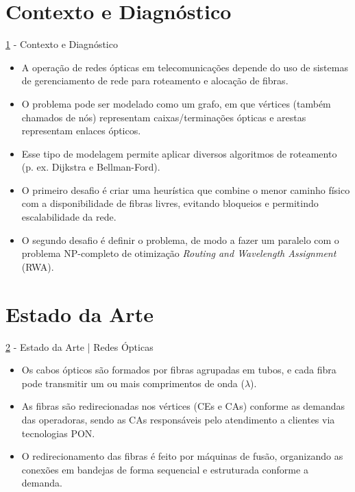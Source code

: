 \documentclass[aspectratio=169,xcolor=dvipsnames]{beamer}
\begin{document}
\section{Contexto e Diagnóstico}\label{sec:contexto}
\begin{frame}{\ref{sec:contexto} - Contexto e Diagnóstico}
\begin{itemize}
  \item A operação de redes ópticas em telecomunicações depende do uso de sistemas de gerenciamento de rede para roteamento e alocação de fibras.
  \item O problema pode ser modelado como um grafo, em que vértices (também chamados de nós) representam caixas/terminações ópticas e arestas representam enlaces ópticos.
  \item Esse tipo de modelagem permite aplicar diversos algoritmos de roteamento (p. ex. Dijkstra e Bellman-Ford).
  \item O primeiro desafio é criar uma heurística que combine o menor caminho físico com a disponibilidade de fibras livres, evitando bloqueios e permitindo escalabilidade da rede.
  \item O segundo desafio é definir o problema, de modo a fazer um paralelo com o problema NP-completo de otimização \textit{Routing and Wavelength Assignment} (RWA).
\end{itemize}

\end{frame}

\section{Estado da Arte}\label{sec:estado_da_arte}
\begin{frame}{\ref{sec:estado_da_arte} - Estado da Arte | Redes Ópticas}
  \begin{itemize}
    \item Os cabos ópticos são formados por fibras agrupadas em tubos, e cada fibra pode transmitir um ou mais comprimentos de onda ($\lambda$).
    \item As fibras são redirecionadas nos vértices (CEs e CAs) conforme as demandas das operadoras, sendo as CAs responsáveis pelo atendimento a clientes via tecnologias PON.
    \item O redirecionamento das fibras é feito por máquinas de fusão, organizando as conexões em bandejas de forma sequencial e estruturada conforme a demanda.
  \end{itemize}
\end{frame}
\end{document}
